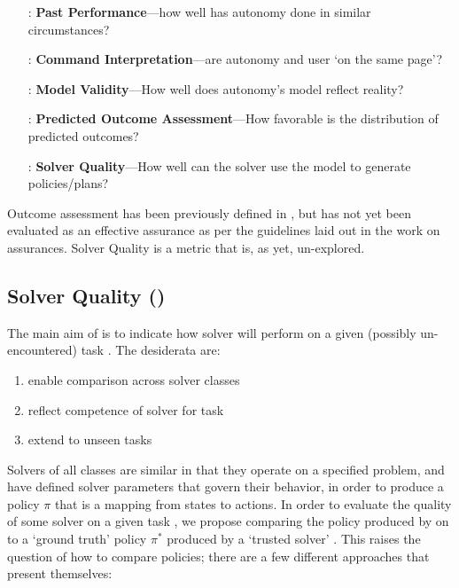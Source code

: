         \begin{itemize}
            \item [\xH{}:] \textbf{Past Performance}---how well has autonomy done in similar circumstances?
            \item [\xI{}:] \textbf{Command Interpretation}---are autonomy and user `on the same page'?
            \item [\xM{}:] \textbf{Model Validity}---How well does autonomy's model reflect reality?
            \item [\xP{}:] \textbf{Predicted Outcome Assessment}---How favorable is the distribution of predicted outcomes?
            \item [\xQ{}:] \textbf{Solver Quality}---How well can the solver use the model to generate policies/plans?
        \end{itemize}

    Outcome assessment has been previously defined in \cite{Aitken2016-cv}, but has not yet been evaluated as an effective assurance as per the guidelines laid out in the work on assurances. Solver Quality is a metric that is, as yet, un-explored.

\subsection{Solver Quality (\xQ)} \label{sec:SQ}
    The main aim of \xQ{} is to indicate how solver \solve{} will perform on a given (possibly un-encountered) task \task{}. The desiderata are:

    \begin{enumerate}[label=\textbf{D\arabic*}]
        \item enable comparison across solver classes \label{itm:d1}
        \item reflect competence of solver \solve{} for task \task{} \label{itm:d2}
        \item extend to unseen tasks \label{itm:d3}
    \end{enumerate}

    Solvers of all classes are similar in that they operate on a specified problem, and have defined solver parameters that govern their behavior, in order to produce a policy $\pi$ that is a mapping from states to actions. In order to evaluate the quality of some solver on a given task \task, we propose comparing the policy \policy{} produced by \solve{} on \task{} to a `ground truth' policy $\pi^*$ produced by a `trusted solver' \solvestar. This raises the question of how to compare policies; there are a few different approaches that present themselves:

